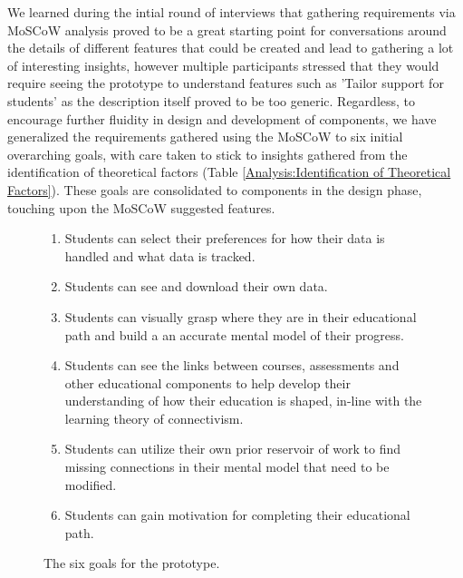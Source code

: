 \documentclass{l4proj}
\begin{document}
We learned during the intial round of interviews that gathering requirements via MoSCoW analysis proved to be a great starting point for conversations around the details of different features that could be created and lead to gathering a lot of interesting insights, however multiple participants stressed that they would require seeing the prototype to understand features such as 'Tailor support for students' as the description itself proved to be too generic. Regardless, to encourage further fluidity in design and development of components, we have generalized the requirements gathered using the MoSCoW to six initial overarching goals, with care taken to stick to insights gathered from the identification of theoretical factors (Table \ref{Analysis:Identification of Theoretical Factors}). These goals are consolidated to components in the design phase, touching upon the MoSCoW suggested features.

\begin{figure}[!ht] %
    \begin{minipage}{\textwidth}
    \caption{The six goals for the prototype.}

    \begin{enumerate}

    \item Students can select their preferences for how their data is handled and what data is tracked. 
    \item Students can see and download their own data.
    \item Students can visually grasp where they are in their educational path and build a an accurate mental model of their progress.
    \item Students can see the links between courses, assessments and other educational components to help develop their understanding of how their education is shaped, in-line with the learning theory of connectivism.
    \item Students can utilize their own prior reservoir of work to find missing connections in their mental model that need to be modified.
    \item Students can gain motivation for completing their educational path.
    \end{enumerate}
    
    \label{fig:fivegoals}
    \end{minipage}
\end{figure}



\end{document}
